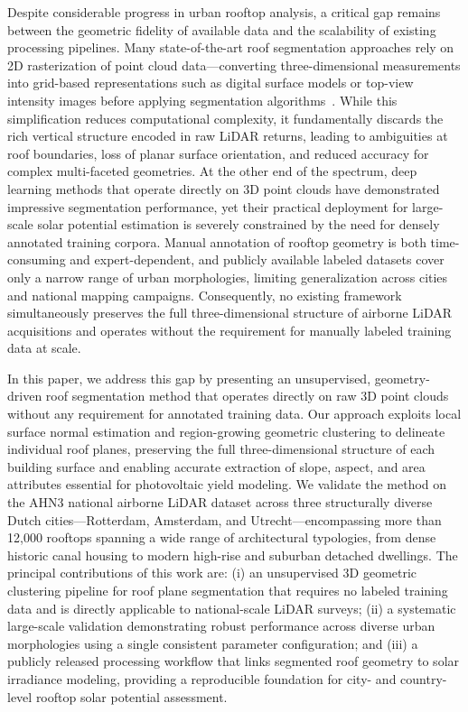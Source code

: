 Despite considerable progress in urban rooftop analysis, a critical gap remains between the geometric fidelity of available data and the scalability of existing processing pipelines. Many state-of-the-art roof segmentation approaches rely on 2D rasterization of point cloud data---converting three-dimensional measurements into grid-based representations such as digital surface models or top-view intensity images before applying segmentation algorithms~\cite{example}. While this simplification reduces computational complexity, it fundamentally discards the rich vertical structure encoded in raw LiDAR returns, leading to ambiguities at roof boundaries, loss of planar surface orientation, and reduced accuracy for complex multi-faceted geometries. At the other end of the spectrum, deep learning methods that operate directly on 3D point clouds have demonstrated impressive segmentation performance, yet their practical deployment for large-scale solar potential estimation is severely constrained by the need for densely annotated training corpora. Manual annotation of rooftop geometry is both time-consuming and expert-dependent, and publicly available labeled datasets cover only a narrow range of urban morphologies, limiting generalization across cities and national mapping campaigns. Consequently, no existing framework simultaneously preserves the full three-dimensional structure of airborne LiDAR acquisitions and operates without the requirement for manually labeled training data at scale.

In this paper, we address this gap by presenting an unsupervised, geometry-driven roof segmentation method that operates directly on raw 3D point clouds without any requirement for annotated training data. Our approach exploits local surface normal estimation and region-growing geometric clustering to delineate individual roof planes, preserving the full three-dimensional structure of each building surface and enabling accurate extraction of slope, aspect, and area attributes essential for photovoltaic yield modeling. We validate the method on the AHN3 national airborne LiDAR dataset across three structurally diverse Dutch cities---Rotterdam, Amsterdam, and Utrecht---encompassing more than 12,000 rooftops spanning a wide range of architectural typologies, from dense historic canal housing to modern high-rise and suburban detached dwellings. The principal contributions of this work are: (i) an unsupervised 3D geometric clustering pipeline for roof plane segmentation that requires no labeled training data and is directly applicable to national-scale LiDAR surveys; (ii) a systematic large-scale validation demonstrating robust performance across diverse urban morphologies using a single consistent parameter configuration; and (iii) a publicly released processing workflow that links segmented roof geometry to solar irradiance modeling, providing a reproducible foundation for city- and country-level rooftop solar potential assessment.
